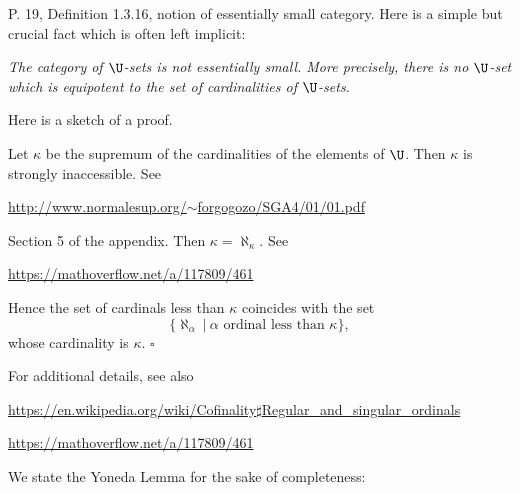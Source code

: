 \documentclass[12pt]{article}
\theoremstyle{remark}
\theoremstyle{definition}
\begin{document}
P. 19, Definition 1.3.16, notion of essentially small category. Here is a simple but crucial fact which is often left implicit: 

\emph{The category of $\U$-sets is \emph{not} essentially small. More precisely, there is no $\U$-set which is equipotent to the set of cardinalities of $\U$-sets.}


Here is a sketch of a proof.

Let $\kappa$ be the supremum of the cardinalities of the elements of $\U$. Then $\kappa$ is strongly inaccessible. See\medskip 

\centerline{\href{http://www.normalesup.org/~forgogozo/SGA4/01/01.pdf}{http://www.normalesup.org/$\sim$forgogozo/SGA4/01/01.pdf}}

\nn Section 5 of the appendix. Then $\kappa=\aleph_\kappa$. See\medskip 

\centerline{\href{https://mathoverflow.net/a/117809/461}{https://mathoverflow.net/a/117809/461}}

\nn Hence the set of cardinals less than $\kappa$ coincides with the set
$$
\{\aleph_\alpha\ |\ \alpha\text{ ordinal less than }\kappa\},
$$ 
whose cardinality is $\kappa$. $\square$

For additional details, see also\medskip 

\centerline{\href{https://en.wikipedia.org/wiki/Cofinality\#Regular_and_singular_ordinals}
{https://en.wikipedia.org/wiki/Cofinality$\sharp$Regular\_and\_singular\_ordinals}}
\medskip 

\centerline{\href{https://mathoverflow.net/a/117809/461}{https://mathoverflow.net/a/117809/461}}




We state the Yoneda Lemma for the sake of completeness:
\end{document}
